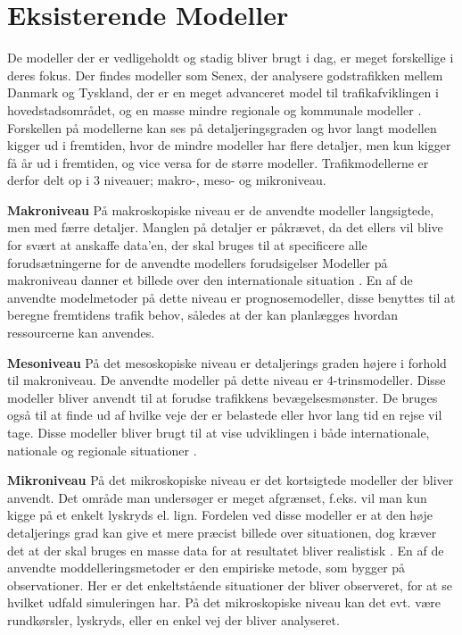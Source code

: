 \section{Eksisterende Modeller}

De modeller der er vedligeholdt og stadig bliver brugt i dag, er meget forskellige i deres fokus. Der findes modeller som Senex, der analysere godstrafikken mellem Danmark og Tyskland, der er en meget advanceret model til trafikafviklingen i hovedstadsområdet, og en masse mindre regionale og kommunale modeller \cite[s. 2]{dtfnotat}. Forskellen på modellerne kan ses på detaljeringsgraden og hvor langt modellen kigger ud i fremtiden, hvor de mindre modeller har flere detaljer, men kun kigger få år ud i fremtiden, og vice versa for de større modeller. Trafikmodellerne er derfor delt op i 3 niveauer; makro-, meso- og mikroniveau.

\vspace{5mm}

\textbf{Makroniveau} På makroskopiske niveau er de anvendte modeller langsigtede, men med færre detaljer. Manglen på detaljer er påkrævet, da det ellers vil blive for svært at anskaffe data’en, der skal bruges til at specificere alle forudsætningerne for de anvendte modellers forudsigelser \cite[s. 1]{dtfnotat} Modeller på makroniveau danner et billede over den internationale situation \cite[s. 9]{dtfnotat}. En af de anvendte modelmetoder på dette niveau er prognosemodeller, disse benyttes til at beregne fremtidens trafik behov, således at der kan planlægges hvordan ressourcerne kan anvendes.\cite{TrafiksimuleringVisSim}


\vspace{5mm}

\textbf{Mesoniveau} På det mesoskopiske niveau er detaljerings graden højere i forhold til makroniveau. De anvendte modeller på dette niveau er 4-trinsmodeller. Disse modeller bliver anvendt til at forudse trafikkens bevægelsesmønster.\cite{TrafiksimuleringVisSim} De bruges også til at finde ud af hvilke veje der er belastede eller hvor lang tid en rejse vil tage. Disse modeller bliver brugt til at vise udviklingen i både internationale, nationale og regionale situationer \cite[s. 9]{dtfnotat}.

\vspace{5mm}

\textbf{Mikroniveau} På det mikroskopiske niveau er det kortsigtede modeller der bliver anvendt. Det område man undersøger er meget afgrænset, f.eks. vil man kun kigge på et enkelt lyskryds el. lign. Fordelen ved disse modeller er at den høje detaljerings grad kan give et mere præcist billede over situationen, dog kræver det at der skal bruges en masse data for at resultatet bliver realistisk \cite[s. 9]{dtfnotat}. En af de anvendte moddelleringsmetoder er den empiriske metode, som bygger på observationer. Her er det enkeltstående situationer der bliver observeret, for at se hvilket udfald simuleringen har. På det mikroskopiske niveau kan det evt. være rundkørsler, lyskryds, eller en enkel vej der bliver analyseret.\cite{TrafiksimuleringVisSim}

